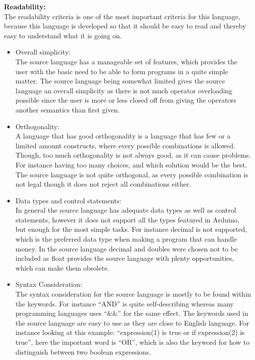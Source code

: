 \textbf{Readability:} \\
The readability criteria is one of the most important criteria for this language, because this language is developed so that it should be easy to read and thereby easy to understand what it is going on. \\
\begin{itemize}
\item Overall simplicity:\\
The source language has a manageable set of features, which provides the user with the basic need to be able to form programs in a quite simple matter. The source language being somewhat limited gives the source language an overall simplicity as there is not much operator overloading possible since the user is more or less closed off from giving the operators another semantics than first given. 
\item Orthogonality:\\
A language that has good orthogonality is a language that has few or a limited amount constructs, where every possible combinations is allowed. Though, too much orthogonality is not always good, as it can cause problems. For instance having too many choices, and which solution would be the best.\\
The source language is not quite orthogonal, as every possible combination is not legal though it does not reject all combinations either.  
\item Data types and control statements:\\
In general the source language has adequate data types as well as control statements, however it does not support all the types featured in Arduino, but enough for the most simple tasks. For instance decimal is not supported, which is the preferred data type when making a program that can handle money. In the source language decimal and doubles were chosen not to be included as float provides the source language with plenty opportunities, which can make them obsolete.
\item Syntax Consideration:\\
The syntax consideration for the source language is mostly to be found within the keywords. For instance ``AND'' is quite self-describing whereas many programming languages uses ``\&\&'' for the same effect. The keywords used in the source language are easy to use as they are close to English language. For instance looking at this example: ``expression(1) is true or if expression(2) is true'', here the important word is ``OR'', which is also the keyword for how to distinguish between two boolean expressions.
\end{itemize}
